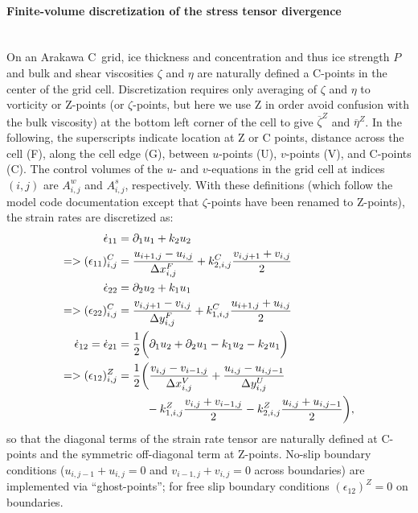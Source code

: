 
\paragraph{Finite-volume discretization of the stress tensor
  divergence\label{sec:pkg:seaice:discretization}}~\\
%
On an Arakawa C~grid, ice thickness and concentration and thus ice
strength $P$ and bulk and shear viscosities $\zeta$ and $\eta$ are
naturally defined a C-points in the center of the grid
cell. Discretization requires only averaging of $\zeta$ and $\eta$ to
vorticity or Z-points (or $\zeta$-points, but here we use Z in order
avoid confusion with the bulk viscosity) at the bottom left corner of
the cell to give $\overline{\zeta}^{Z}$ and $\overline{\eta}^{Z}$. In
the following, the superscripts indicate location at Z or C points,
distance across the cell (F), along the cell edge (G), between
$u$-points (U), $v$-points (V), and C-points (C). The control volumes
of the $u$- and $v$-equations in the grid cell at indices $(i,j)$ are
$A_{i,j}^{w}$ and $A_{i,j}^{s}$, respectively. With these definitions
(which follow the model code documentation except that $\zeta$-points
have been renamed to Z-points), the strain rates are discretized as:
\begin{align}
  \dot{\epsilon}_{11} &= \partial_{1}{u}_{1} + k_{2}u_{2} \\ \notag
  => (\epsilon_{11})_{i,j}^C &= \frac{u_{i+1,j}-u_{i,j}}{\Delta{x}_{i,j}^{F}} 
   + k_{2,i,j}^{C}\frac{v_{i,j+1}+v_{i,j}}{2} \\ 
  \dot{\epsilon}_{22} &= \partial_{2}{u}_{2} + k_{1}u_{1} \\\notag
  => (\epsilon_{22})_{i,j}^C &= \frac{v_{i,j+1}-v_{i,j}}{\Delta{y}_{i,j}^{F}} 
   + k_{1,i,j}^{C}\frac{u_{i+1,j}+u_{i,j}}{2} \\ 
   \dot{\epsilon}_{12} = \dot{\epsilon}_{21} &= \frac{1}{2}\biggl(
   \partial_{1}{u}_{2} + \partial_{2}{u}_{1} - k_{1}u_{2} - k_{2}u_{1}
   \biggr) \\ \notag
  => (\epsilon_{12})_{i,j}^Z &= \frac{1}{2}
  \biggl( \frac{v_{i,j}-v_{i-1,j}}{\Delta{x}_{i,j}^V} 
   + \frac{u_{i,j}-u_{i,j-1}}{\Delta{y}_{i,j}^U} \\\notag
  &\phantom{=\frac{1}{2}\biggl(}
   - k_{1,i,j}^{Z}\frac{v_{i,j}+v_{i-1,j}}{2}
   - k_{2,i,j}^{Z}\frac{u_{i,j}+u_{i,j-1}}{2}
   \biggr),
\end{align}
so that the diagonal terms of the strain rate tensor are naturally
defined at C-points and the symmetric off-diagonal term at
Z-points. No-slip boundary conditions ($u_{i,j-1}+u_{i,j}=0$ and
$v_{i-1,j}+v_{i,j}=0$ across boundaries) are implemented via
``ghost-points''; for free slip boundary conditions
$(\epsilon_{12})^Z=0$ on boundaries.

